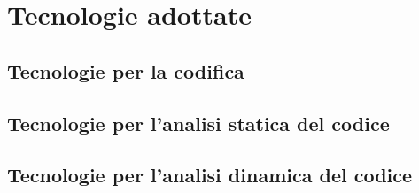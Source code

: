\section{Tecnologie adottate}

\subsection{Tecnologie per la codifica}

\subsection{Tecnologie per l'analisi statica del codice}

\subsection{Tecnologie per l'analisi dinamica del codice}

